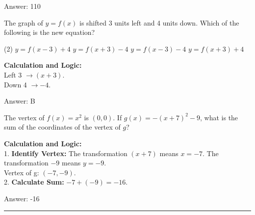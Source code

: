 \documentclass[11pt,paper=a4,answers]{exam}
\begin{document}
\begin{questions}
\begin{solution}
\vspace{25pt}

Answer: \colorbox{yellow!100}{110}
\end{solution}

\vspace{40pt}

\question
The graph of $y = f(x)$ is shifted 3 units left and 4 units down. Which of the following is the new equation?
\begin{tasks}(2)
    \task $y = f(x-3) + 4$
    \task $y = f(x+3) - 4$
    \task $y = f(x-3) - 4$
    \task $y = f(x+3) + 4$
\end{tasks}

\begin{solution}
\textbf{Calculation and Logic:} \\
Left 3 $\rightarrow (x+3)$. \\
Down 4 $\rightarrow - 4$.

\vspace{25pt}

Answer: \colorbox{yellow!100}{B}
\end{solution}

\vspace{40pt}

\question
The vertex of $f(x) = x^2$ is $(0, 0)$. If $g(x) = -(x+7)^2 - 9$, what is the sum of the coordinates of the vertex of $g$?

\begin{solution}
\textbf{Calculation and Logic:} \\
1. \textbf{Identify Vertex:} The transformation $(x+7)$ means $x = -7$. The transformation $-9$ means $y = -9$. \\
Vertex of g: $(-7, -9)$. \\
2. \textbf{Calculate Sum:} $-7 + (-9) = -16$.

\vspace{25pt}

Answer: \colorbox{yellow!100}{-16}
\end{solution}

\end{questions}
\begin{center}
\rule{.5\textwidth}{1pt}
\end{center}
\end{document}
